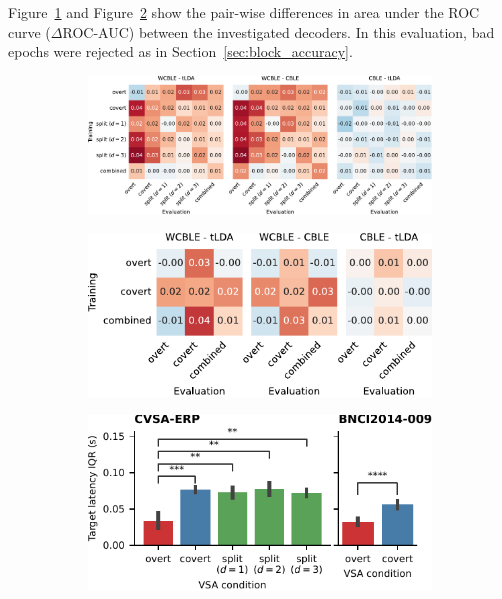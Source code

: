 Figure~\ref{fig:covert_cross_eval} and Figure~\ref{fig:aloise2012_cross_eval} show
the pair-wise differences in area under the ROC curve ($\Delta$ROC-AUC)
between the investigated decoders.
In this evaluation, bad epochs were rejected as in Section~\ref{sec:block_accuracy}.
\begin{figure}
  \bigskip
	\begin{subfigure}{\linewidth}
		\caption{}
		\label{fig:covert_cross_eval}
		\includegraphics[width=\linewidth]{figures/covert_align/figure5a.pdf}
	\end{subfigure}

	\bigskip
	\bigskip

	\begin{subfigure}[c]{.48\linewidth}
		\caption{}
		\label{fig:aloise2012_cross_eval}
		\includegraphics[width=\linewidth]{figures/covert_align/figure5b.pdf}
	\end{subfigure}\hfill%
	\begin{subfigure}[c]{.48\linewidth}
		\caption{}
		\label{fig:jitter}
		\includegraphics[width=\linewidth]{figures/covert_align/figure5c.pdf}
	\end{subfigure}


\end{figure}
